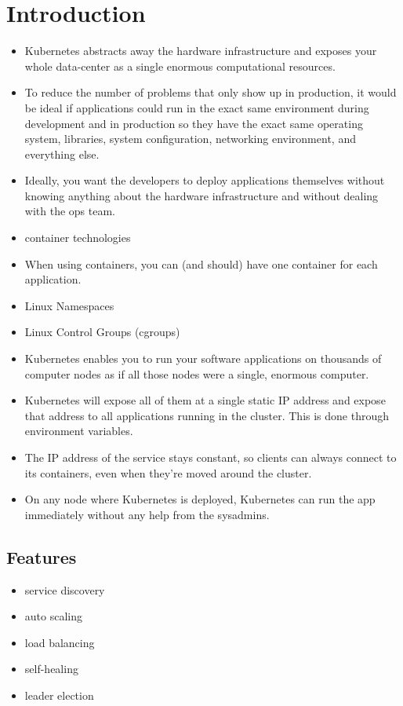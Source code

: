 
\chapter{Introduction}

\begin{itemize}
	\item Kubernetes abstracts away the hardware infrastructure and exposes your whole data-center as a single enormous computational resources.
	\item To reduce the number of problems that only show up in production, it would be ideal if applications could run in the exact same environment during development and in production so they have the exact same operating system, libraries, system configuration, networking environment, and everything else.
	\item Ideally, you want the developers to deploy applications themselves without knowing anything about the hardware infrastructure and without dealing with the ops team.
	\item container technologies
	\item When using containers, you can (and should) have one container for each application.
	\item Linux Namespaces
	\item Linux Control Groups (cgroups)
	\item Kubernetes enables you to run your software applications on thousands of computer nodes as if all those nodes were a single, enormous computer.
	\item Kubernetes will expose all of them at a single static IP address and expose that address to all applications running in the cluster. This is done through environment variables.
	\item The IP address of the service stays constant, so clients can always connect to its containers, even when they're moved around the cluster.
	\item On any node where Kubernetes is deployed, Kubernetes can run the app immediately without any help from the sysadmins.
\end{itemize}


\section{Features}
\begin{itemize}
	\item service discovery
	\item auto scaling
	\item load balancing
	\item self-healing
	\item leader election
\end{itemize}

